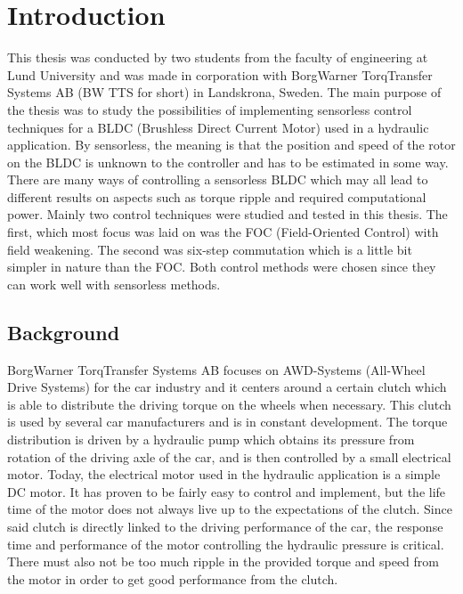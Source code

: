 \documentclass{LTHthesis}
\begin{document}
\chapter{Introduction}

This thesis was conducted by two students from the faculty of engineering at Lund University and was made in corporation with BorgWarner TorqTransfer Systems AB (BW TTS for short) in Landskrona, Sweden. The main purpose of the thesis was to study the possibilities of implementing sensorless control techniques for a BLDC (Brushless Direct Current Motor) used in a hydraulic application. By sensorless, the meaning is that the position and speed of the rotor on the BLDC is unknown to the controller and has to be estimated in some way.
There are many ways of controlling a sensorless BLDC which may all lead to different results on aspects such as torque ripple and required computational power. Mainly two control techniques were studied and tested in this thesis. The first, which most focus was laid on was the FOC (Field-Oriented Control) with field weakening. The second was six-step commutation which is a little bit simpler in nature than the FOC. Both control methods were chosen since they can work well with sensorless methods.
\section{Background}
BorgWarner TorqTransfer Systems AB focuses on AWD-Systems (All-Wheel Drive Systems) for the car industry and it centers around a certain clutch which is able to distribute the driving torque on the wheels when necessary. This clutch is used by several car manufacturers and is in constant development. The torque distribution is driven by a hydraulic pump which obtains its pressure from rotation of the driving axle of the car, and is then controlled by a small electrical motor. Today, the electrical motor used in the hydraulic application is a simple DC motor. It has proven to be fairly easy to control and implement, but the life time of the motor does not always live up to the expectations of the clutch. Since said clutch is directly linked to the driving performance of the car, the response time and performance of the motor  controlling the hydraulic pressure is critical. There must also not be too much ripple in the provided torque and speed from the motor in order to get good performance from the clutch.
\end{document}
